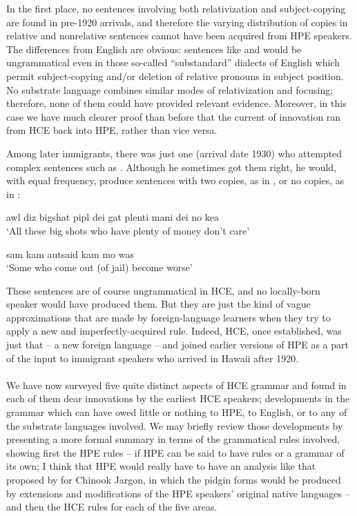 In the first place, no sentences involving both relativization and subject-copying are found in pre-1920 arrivals, and therefore the varying distribution of copies in relative and nonrelative sentences cannot have been acquired from HPE speakers. The differences from English are obvious: sentences like   and   would be ungramma\-tical even in those so-called ``substandard'' dialects of English which permit subject-copying and/or deletion of relative pronouns in subject position. No substrate language combines similar modes of relativization and focusing; therefore, none of them could have pro\-vided relevant evidence. Moreover, in this case we have much clearer proof than before that the current of innovation ran from HCE back into HPE, rather than vice versa.

Among later immigrants, there was just one (arrival date 1930) who attempted complex sentences such as . Although he some\-times got them right, he would, with equal frequency, produce sen\-tences with two copies, as in , or no copies, as in :

\ea\label{ex:84}
awl diz bigshat pipl dei gat plenti mani dei no kea\\
\glt `All these big shots who have plenty of money don't care' 
\z

\ea\label{ex:85} 
sam kam autsaid kam mo was\\
\glt `Some who come out (of jail) become worse'
\z

\noindent These sentences are of course ungrammatical in HCE, and no locally-born speaker would have produced them. But they are just the kind of vague approximations that are made by foreign-language learners when they try to apply a new and imperfectly-acquired rule. Indeed, HCE, once established, was just that -- a new foreign language -- and joined earlier versions of HPE as a part of the input to immigrant speakers who arrived in Hawaii after 1920.\\\\


We have now surveyed five quite distinct aspects of HCE gram\-mar and found in each of them dear innovations by the earliest HCE
speakers; developments in the grammar which can have owed little or nothing to HPE, to English, or to any of the substrate languages involved. We may briefly review those developments by presenting a more formal summary in terms of the grammatical rules involved, showing first the HPE rules -- if HPE can be said to have rules or a grammar of its own; I think that HPE would really have to have an analysis like that proposed by \citet{Silverstein1972} for Chinook Jargon, in which the pidgin forms would be produced by extensions and modifications of the HPE speakers' original native languages -- and then the HCE rules for each of the five areas.

